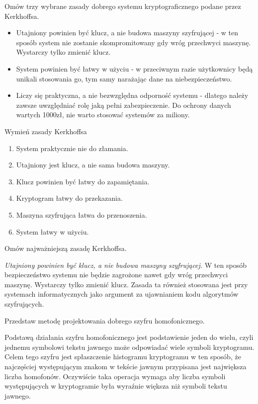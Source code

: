 \documentclass[answers,11pt]{exam}
\begin{document}
\begin{questions}

\question Omów trzy wybrane zasady dobrego systemu kryptograficznego podane przez Kerkhoffsa.
\begin{solution}
\begin{itemize}
\item Utajniony powinien być klucz, a nie budowa maszyny szyfrującej - w ten sposób system nie zostanie skompromitowany gdy wróg przechwyci maszynę. Wystarczy tylko zmienić klucz.
\item System powinien być łatwy w użyciu - w przeciwnym razie użytkownicy będą unikali stosowania go, tym samy narażając dane na niebezpieczeństwo.
\item Liczy się praktyczna, a nie bezwzględna odporność systemu - dlatego należy zawsze uwzględniać rolę jaką pełni zabezpieczenie. Do ochrony danych wartych 1000zł, nie warto stosować systemów za miliony.
\end{itemize}
\end{solution}

\question Wymień zasady Kerkhoffsa
\begin{solution}
\begin{enumerate}
\item System praktycznie nie do złamania.
\item Utajniony jest klucz, a nie sama budowa maszyny. 
\item Klucz powinien być łatwy do zapamiętania.
\item Kryptogram łatwy do przekazania.
\item Maszyna szyfrująca łatwa do przenoszenia. 
\item System łatwy w użyciu.
\end{enumerate}
\end{solution}

\question Omów najważniejszą zasadę Kerkhoffsa.
\begin{solution}
\emph{Utajniony powinien być klucz, a nie budowa maszyny szyfrującej.} W ten sposób bezpieczeństwo systemu nie będzie zagrożone nawet gdy wróg przechwyci maszynę. Wystarczy tylko zmienić klucz. Zasada ta również stosowana jest przy systemach informatycznych jako argument za ujawnianiem kodu algorytmów szyfrujących.
\end{solution}

\question Przedstaw metodę projektowania dobrego szyfru homofonicznego.
\begin{solution}
Podstawą działania szyfru homofonicznego jest podstawienie jeden do wielu, czyli jednemu symbolowi tekstu jawnego może odpowiadać wiele symboli kryptogramu. Celem tego szyfru jest spłaszczenie histogramu kryptogramu w ten sposób, że najczęściej występującym znakom w tekście jawnym przypisana jest największa liczba homofonów. Oczywiście taka operacja wymaga aby liczba symboli występujących w kryptogramie była wyraźnie większa niż symboli tekstu jawnego.
\end{solution}


\end{questions}
\end{document}
